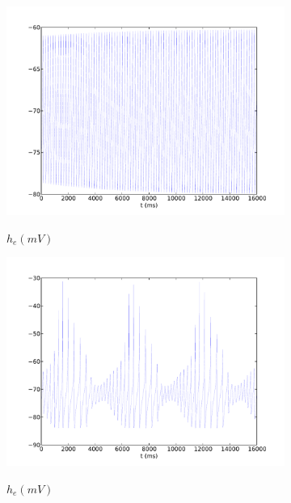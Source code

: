 \documentclass[a4paper,12pt]{article}
\begin{document}
\begin{figure}
	\begin{subfigure}[b]{0.5\textwidth}
		\includegraphics[scale=0.35]{chosen-frontiers-2012/00493-1-he-intra.pdf}
		\label{fig:493_a}
		\caption{$h_e (mV)$}
	\end{subfigure}
	\begin{subfigure}[b]{0.5\textwidth}
		\includegraphics[scale=0.35]{chosen-frontiers-2012/00493-0_5-he-intra.pdf}
		\label{fig:493_b}
		\caption{$h_e (mV)$}
	\end{subfigure}
	\begin{subfigure}[b]{0.5\textwidth}

\end{subfigure}
\end{figure}
\end{document}
